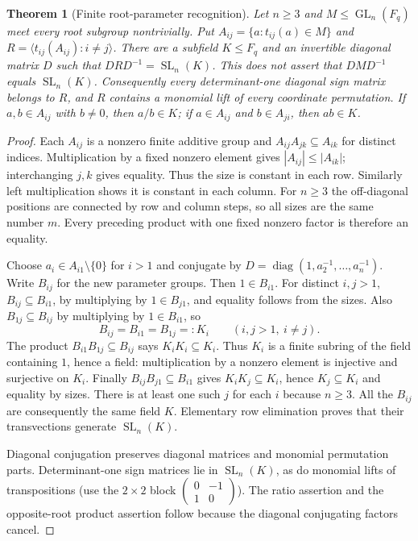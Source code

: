 \documentclass[11pt]{article}
\newtheorem{theorem}{Theorem}\newtheorem{lemma}[theorem]{Lemma}\newtheorem{corollary}[theorem]{Corollary}
\newcommand{\GL}{\operatorname{GL}}\newcommand{\SL}{\operatorname{SL}}
\begin{document}
\begin{theorem}[Finite root-parameter recognition]\label{recognition}
Let $n\geq3$ and $M\leq\GL_n(F_q)$ meet every root subgroup nontrivially.
Put $A_{ij}=\{a:t_{ij}(a)\in M\}$ and
$R=\langle t_{ij}(A_{ij}):i\ne j\rangle$.
There are a subfield $K\leq F_q$ and an invertible diagonal matrix $D$ such
that $DRD^{-1}=\SL_n(K)$. This does not assert that $DMD^{-1}$ equals
$\SL_n(K)$.
Consequently every determinant-one diagonal sign matrix belongs to $R$,
and $R$ contains a monomial lift of every coordinate permutation. If
$a,b\in A_{ij}$ with $b\ne0$, then $a/b\in K$; if
$a\in A_{ij}$ and $b\in A_{ji}$, then $ab\in K$.
\end{theorem}
\begin{proof}
Each $A_{ij}$ is a nonzero finite additive group and
$A_{ij}A_{jk}\subseteq A_{ik}$ for distinct indices. Multiplication by a
fixed nonzero element gives $|A_{ij}|\leq|A_{ik}|$; interchanging $j,k$
gives equality. Thus the size is constant in each row. Similarly left
multiplication shows it is constant in each column. For $n\geq3$ the
off-diagonal positions are connected by row and column steps, so all sizes
are the same number $m$. Every preceding product with one fixed nonzero
factor is therefore an equality.

Choose $a_i\in A_{i1}\setminus\{0\}$ for $i>1$ and conjugate by
$D=\operatorname{diag}(1,a_2^{-1},\ldots,a_n^{-1})$. Write $B_{ij}$ for
the new parameter groups. Then $1\in B_{i1}$. For distinct $i,j>1$,
$B_{ij}\subseteq B_{i1}$, by multiplying by $1\in B_{j1}$, and equality
follows from the sizes. Also $B_{1j}\subseteq B_{ij}$ by multiplying by
$1\in B_{i1}$, so
\[
 B_{ij}=B_{i1}=B_{1j}=:K_i\qquad(i,j>1,\ i\ne j).
\]
The product $B_{i1}B_{1j}\subseteq B_{ij}$ says $K_iK_i\subseteq K_i$.
Thus $K_i$ is a finite subring of the field containing $1$, hence a field:
multiplication by a nonzero element is injective and surjective on $K_i$.
Finally $B_{ij}B_{j1}\subseteq B_{i1}$ gives $K_iK_j\subseteq K_i$, hence
$K_j\subseteq K_i$ and equality by sizes. There is at least one such $j$
for each $i$ because $n\geq3$. All the $B_{ij}$ are consequently the same
field $K$. Elementary row elimination proves that their transvections
generate $\SL_n(K)$.

Diagonal conjugation preserves diagonal matrices and monomial permutation
parts. Determinant-one sign matrices lie in $\SL_n(K)$, as do monomial
lifts of transpositions (use the $2\times2$ block
$\left(\begin{smallmatrix}0&-1\\1&0\end{smallmatrix}\right)$).
The ratio assertion and the opposite-root product assertion follow because
the diagonal conjugating factors cancel.
\end{proof}
\end{document}
